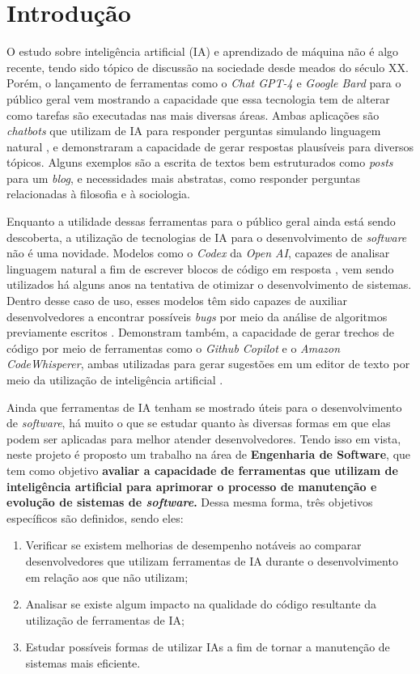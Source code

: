 \section{Introdução}
\label{sec:intro}

O estudo sobre inteligência artificial (IA) e aprendizado de máquina não é algo recente, tendo sido tópico de discussão na sociedade desde meados do século XX.
Porém, o lançamento de ferramentas como o \textit{Chat GPT-4} e \textit{Google Bard} para o público geral vem mostrando a capacidade que essa tecnologia tem de alterar como tarefas são executadas nas mais diversas áreas. Ambas aplicações são \textit{chatbots} que utilizam de IA para responder perguntas simulando linguagem natural \cite{openai-chatgpt,google-bard}, e demonstraram a capacidade de gerar respostas plausíveis para diversos tópicos. Alguns exemplos são a escrita de textos bem estruturados como \textit{posts} para um \textit{blog}, e necessidades mais abstratas, como responder perguntas relacionadas à filosofia e à sociologia.

Enquanto a utilidade dessas ferramentas para o público geral ainda está sendo descoberta, a utilização de tecnologias de IA para o desenvolvimento de \textit{software} não é uma novidade. Modelos como o \textit{Codex} da \textit{Open AI}, capazes de analisar linguagem natural a fim de escrever blocos de código em resposta \cite{openai-codex}, vem sendo utilizados há alguns anos na tentativa de otimizar o desenvolvimento de sistemas. Dentro desse caso de uso, esses modelos têm sido capazes de auxiliar desenvolvedores a encontrar possíveis \textit{bugs} por meio da análise de algoritmos previamente escritos \cite{codex-bugfix}. Demonstram também, a capacidade de gerar trechos de código por meio de ferramentas como o \textit{Github Copilot} e o \textit{Amazon CodeWhisperer}, ambas utilizadas para gerar sugestões em um editor de texto por meio da utilização de inteligência artificial \cite{github-copilot,code-whisperer}.

Ainda que ferramentas de IA tenham se mostrado úteis para o desenvolvimento de \textit{software}, há muito o que se estudar quanto às diversas formas em que elas podem ser aplicadas para melhor atender desenvolvedores. Tendo isso em vista, neste projeto é proposto um trabalho na área de \textbf{Engenharia de Software}, que tem como objetivo \textbf{avaliar a capacidade de ferramentas que utilizam de inteligência artificial para aprimorar o processo de manutenção e evolução de sistemas de \textit{software}.} Dessa mesma forma, três objetivos específicos são definidos, sendo eles:
\begin{enumerate}
  \item Verificar se existem melhorias de desempenho notáveis ao comparar desenvolvedores que utilizam ferramentas de IA durante o desenvolvimento em relação aos que não utilizam;
  \item Analisar se existe algum impacto na qualidade do código resultante da utilização de ferramentas de IA;
  \item Estudar possíveis formas de utilizar IAs a fim de tornar a manutenção de sistemas mais eficiente.
\end{enumerate}

